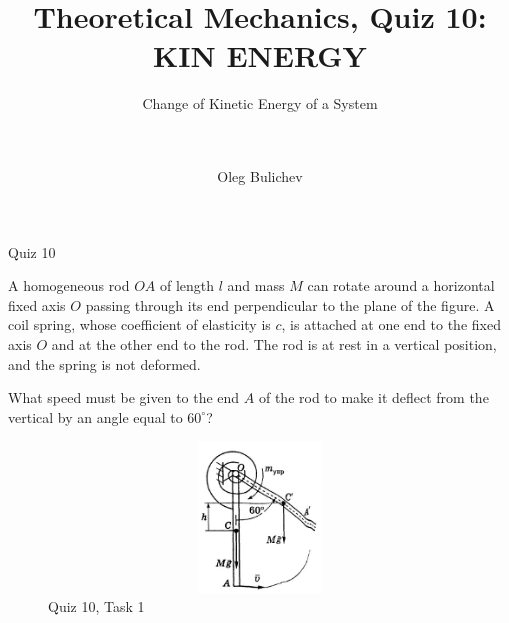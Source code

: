 \documentclass[aspectratio=169,xcolor=table,10pt, notes=hide]{beamer}
\title[Theoretical Mechanics]{Theoretical Mechanics, Quiz 10: KIN ENERGY} %
\subtitle{Change of Kinetic Energy of a System \\ \  \\ \  } %
\author{Oleg Bulichev}
\newcommand{\fbckg}[1]{\usebackgroundtemplate{\texttt{[image: \#1]}}}%
\begin{document}
\setlength{\abovedisplayskip}{0pt}
\setlength{\belowdisplayskip}{0pt}
\setlength{\abovedisplayshortskip}{0pt}
\setlength{\belowdisplayshortskip}{0pt}

\fbckg{fibeamer/figs/title_page.png}

\note{}

\fbckg{fibeamer/figs/common.png}

\begin{frame}[t]{Quiz 10}
  \small
\begin{minipage}{0.6\textwidth}
  A homogeneous rod $OA$ of length $l$ and mass $M$ can rotate around a horizontal fixed axis $O$ passing through its end perpendicular to the plane of the figure. A coil spring, whose coefficient of elasticity is $c$, is attached at one end to the fixed axis $O$ and at the other end to the rod. The rod is at rest in a vertical position, and the spring is not deformed. 

\bigskip

What speed must be given to the end $A$ of the rod to make it deflect from the vertical by an angle equal to $60^\circ$?
\end{minipage}
\begin{minipage}{0.39\textwidth}
  \begin{figure}[H]
    \centering\includegraphics[height=4cm,width=1\textwidth,keepaspectratio]{quiz10_1}
    \caption*{Quiz 10, Task 1}
  \end{figure}
\end{minipage}
\end{frame}
\end{document}

